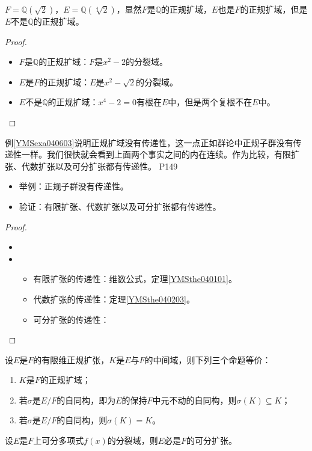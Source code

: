 \begin{example}\label{YMSexa040603}
	$F=\mathbb{Q}(\sqrt{2})$，$E=\mathbb{Q}(\sqrt[4]{2})$，显然$F$是$\mathbb{Q}$的正规扩域，$E$也是$F$的正规扩域，但是$E$不是$\mathbb{Q}$的正规扩域。
\end{example}

\begin{proof}
	\begin{itemize}
		\item $F$是$\mathbb{Q}$的正规扩域：$F$是$x^{2}-2$的分裂域。
		\item $E$是$F$的正规扩域：$E$是$x^{2}-\sqrt{2}$的分裂域。
		\item $E$不是$\mathbb{Q}$的正规扩域：$x^{4}-2=0$有根在$E$中，但是两个复根不在$E$中。
	\end{itemize}
\end{proof}

\original
{
	例\ref{YMSexa040603}说明正规扩域没有传递性，这一点正如群论中正规子群没有传递性一样。我们很快就会看到上面两个事实之间的内在连续。作为比较，有限扩张、代数扩张以及可分扩张都有传递性。
}
{P149}

\begin{proposition}
	\begin{itemize}
		\item 举例：正规子群没有传递性。
		\item 验证：有限扩张、代数扩张以及可分扩张都有传递性。
	\end{itemize}
\end{proposition}

\begin{proof}
	\begin{itemize}
		\item 
		\item 
		\begin{itemize}
			\item 有限扩张的传递性：维数公式，定理\ref{YMSthe040101}。
			\item 代数扩张的传递性：定理\ref{YMSthe040203}。
			\item 可分扩张的传递性：
		\end{itemize}
	\end{itemize}
\end{proof}

\begin{theorem}
	设$E$是$F$的有限维正规扩张，$K$是$E$与$F$的中间域，则下列三个命题等价：
	\begin{enumerate}
		\item $K$是$F$的正规扩域；
		\item 若$\sigma$是$E/F$的自同构，即为$E$的保持$F$中元不动的自同构，则$\sigma(K)\subseteq K$；
		\item 若$\sigma$是$E/F$的自同构，则$\sigma(K)=K$。
	\end{enumerate}
\end{theorem}


\begin{theorem}
	设$E$是$F$上可分多项式$f(x)$的分裂域，则$E$必是$F$的可分扩张。
\end{theorem}








